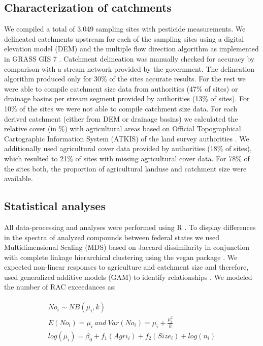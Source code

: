 \documentclass[journal=esthag,manuscript=article]{achemso}
\begin{document}
\subsection{Characterization of catchments}
We compiled a total of 3,049 sampling sites with pesticide measurements.
We delineated catchments upstream for each of the sampling sites using a digital elevation model (DEM) \citep{eea_digital_2013} and the multiple flow direction algorithm \citep{holmgren_multiple_1994} as implemented in GRASS GIS 7 \citep{neteler_grass_2012}.
Catchment delineation was manually checked for accuracy by comparison with a stream network provided by the government.
The delineation algorithm produced only for 30\% of the sites accurate results.
For the rest we were able to compile catchment size data from authorities (47\% of sites) or drainage basins per stream segment provided by authorities (13\% of sites).
For 10\% of the sites we were not able to compile catchment size data.
For each derived catchment (either from DEM or drainage basins) we calculated the relative cover (in \%) with agricultural areas based on Official Topographical Cartographic Information System (ATKIS) of the land survey authorities \citep{adv_atkis_2016}.
We additionally used agricultural cover data provided by authorities (18\% of sites), which resulted to 21\% of sites with missing agricultural cover data. 
For 78\% of the sites both, the proportion of agricultural landuse and catchment size were available.


\subsection{Statistical analyses}
All data-processing and analyses were performed using R \citep{r_core_team_r:_2016}.
To display differences in the spectra of analyzed compounds between federal states we used Multidimensional Scaling (MDS) based on Jaccard dissimilarity in conjunction with complete linkage hierarchical clustering using the vegan package \citep{oksanen_vegan:_2016}.
We expected non-linear responses to agriculture and catchment size and therefore, used generalized additive models (GAM) to identify relationships \citep{fewster_analysis_2000}.
We modeled the number of RAC exceedances as:

\begin{align}
\begin{split}
  No_i \sim NB(\mu_i, k) \\
  E(No_i) = \mu_i~and~Var(No_i) = \mu_i + \frac{\mu_i^2}{k} \\
  log(\mu_i)= \beta_0 + f_1(Agri_i) + f_2(Size_i) + log(n_i) \\
\end{split}
\end{align}
\end{document}
